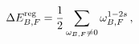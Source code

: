 \begin{equation}
\Delta E^{\rm reg}_{B,F}=\frac 12 \sum_{\omega_{B,F}\ne 0} \omega_{B,F}^{1-2s}
\,,
\label{DEreg}
\end{equation}

